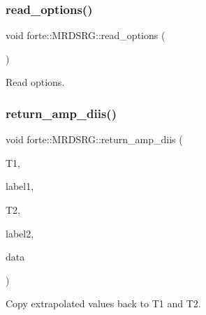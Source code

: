 \subsubsection{\texorpdfstring{read\+\_\+options()}{read\_options()}}
{\footnotesize\ttfamily void forte\+::\+M\+R\+D\+S\+R\+G\+::read\+\_\+options (\begin{DoxyParamCaption}{ }\end{DoxyParamCaption})\hspace{0.3cm}{\ttfamily [protected]}}



Read options. 

\mbox{\label{classforte_1_1_m_r_d_s_r_g_a6130e600042b6dfdc2aee4e37b39b736}} 
\subsubsection{\texorpdfstring{return\+\_\+amp\+\_\+diis()}{return\_amp\_diis()}}
{\footnotesize\ttfamily void forte\+::\+M\+R\+D\+S\+R\+G\+::return\+\_\+amp\+\_\+diis (\begin{DoxyParamCaption}\item[{Blocked\+Tensor \&}]{T1,  }\item[{const std\+::vector$<$ std\+::string $>$ \&}]{label1,  }\item[{Blocked\+Tensor \&}]{T2,  }\item[{const std\+::vector$<$ std\+::string $>$ \&}]{label2,  }\item[{const std\+::vector$<$ double $>$ \&}]{data }\end{DoxyParamCaption})\hspace{0.3cm}{\ttfamily [protected]}}



Copy extrapolated values back to T1 and T2. 

\mbox{\label{classforte_1_1_m_r_d_s_r_g_a5694577e3f4d5fdb3946c6cbf0a56ad2}} 
